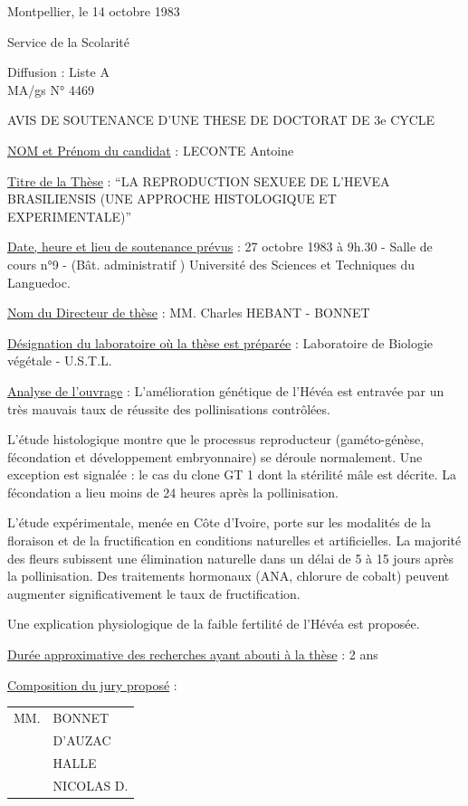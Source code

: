Montpellier, le 14 octobre 1983

Service de la Scolarité

Diffusion : Liste A\\
MA/gs \hfill N° 4469

\begin{center}
AVIS DE SOUTENANCE D'UNE THESE DE DOCTORAT DE 3e CYCLE

\end{center}

\uline{NOM et Prénom du candidat} : LECONTE Antoine

\uline{Titre de la Thèse} : ``LA REPRODUCTION SEXUEE DE L'HEVEA BRASILIENSIS (UNE APPROCHE HISTOLOGIQUE ET EXPERIMENTALE)''

\uline{Date, heure et lieu de soutenance prévus} : 27 octobre 1983 à 9h.30 - Salle de cours n°9 - (Bât. administratif ) Université des Sciences et Techniques du Languedoc.

\uline{Nom du Directeur de thèse} : MM. Charles HEBANT - BONNET

\uline{Désignation du laboratoire où la thèse est préparée} : Laboratoire de Biologie végétale - U.S.T.L.

\uline{Analyse de l'ouvrage} : L'amélioration génétique de l'Hévéa est entravée par un très mauvais taux de réussite des pollinisations contrôlées.

L'étude histologique montre que le processus reproducteur (gaméto-génèse, fécondation et développement embryonnaire) se déroule normalement. Une exception est signalée : le cas du clone GT 1 dont la stérilité mâle est décrite. La fécondation a lieu moins de 24 heures après la pollinisation.

L'étude expérimentale, menée en Côte d'Ivoire, porte sur les modalités de la floraison et de la fructification en conditions naturelles et artificielles. La majorité des fleurs subissent une élimination naturelle dans un délai de 5 à 15 jours après la pollinisation. Des traitements hormonaux (ANA, chlorure de cobalt) peuvent augmenter significativement le taux de fructification.

Une explication physiologique de la faible fertilité de l'Hévéa est proposée.

\uline{Durée approximative des recherches ayant abouti à la thèse} : 2 ans

\uline{Composition du jury proposé} : \begin{tabular}[t]{ll}
MM. & BONNET\\
& D'AUZAC\\
& HALLE\\
& NICOLAS D.
\end{tabular}

